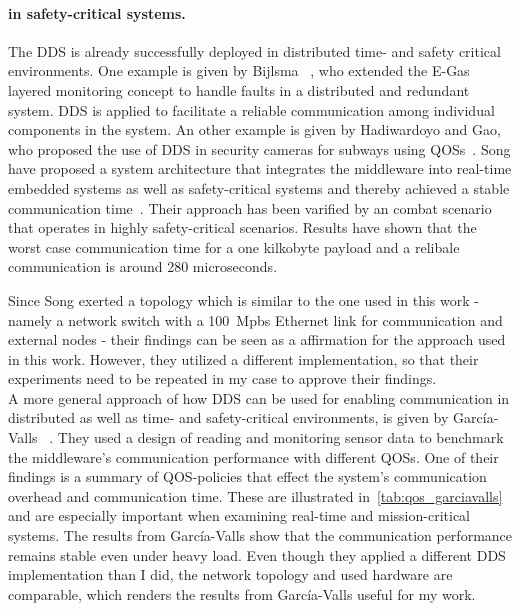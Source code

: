 \paragraph{ in safety-critical systems.}
The \gls*{DDS} is already successfully deployed in distributed time- and safety critical environments.
One example is given by Bijlsma \etal~\cite{DistributedSafety2020}, who extended the E-Gas layered monitoring concept to handle faults in a distributed and redundant system.
\Gls*{DDS} is applied to facilitate a reliable communication among individual components in the system.
An other example is given by Hadiwardoyo and Gao, who proposed the use of \gls*{DDS} in security cameras for subways using \glspl*{QOS}~\cite{DDSInSubways}.
Song \etal have proposed a system architecture that integrates the  middleware into real-time embedded systems as well as safety-critical systems and thereby achieved a stable communication time~\cite{SongDDSInRealTimeSystems}.
Their approach has been varified by an  combat scenario that operates in highly safety-critical scenarios.
Results have shown that the worst case communication time for a one kilkobyte payload and a relibale communication  is around 280 microseconds.

Since Song \etal exerted a topology which is similar to the one used in this work - namely a network switch with a 100~Mpbs Ethernet link for communication and external nodes - their findings can be seen as a affirmation for the approach used in this work.
However, they utilized a different  implementation, so that their experiments need to be repeated in my case to approve their findings. 
\\

A more general approach of how \gls*{DDS} can be used for enabling communication in distributed as well as time- and safety-critical environments, is given by García-Valls \etal~\cite{GarciaVallsDDSInDistributed}.
They used a design of reading and monitoring sensor data to benchmark the middleware's communication performance with different \glspl*{QOS}.
One of their findings is a summary of \gls*{QOS}-policies that effect the system's communication overhead and communication time.
These are illustrated in~\autoref{tab:qos_garciavalls} and are especially important when examining real-time and mission-critical systems.
The results from García-Valls \etal show that the communication performance remains stable even under heavy load.
Even though they applied a different \gls*{DDS} implementation than I did, the network topology and used hardware are comparable, which renders the results from García-Valls \etal useful for my work.


